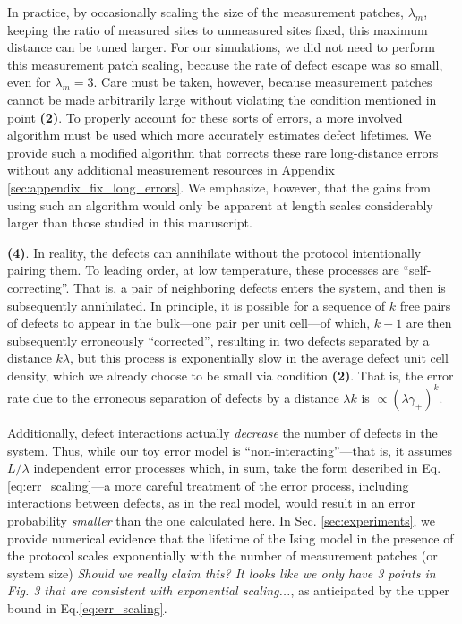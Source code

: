\documentclass[twocolumn,superscriptaddress,aps,prb,floatfix]{revtex4-1}
\newcommand{\CMH}[1]{{\color{green} { #1}}}
\begin{document}
 In practice, by occasionally scaling the size of the measurement patches, $\lambda_m$, keeping the ratio of measured sites to unmeasured sites fixed, this maximum distance can be tuned larger.  For our simulations, we did not need to perform this measurement patch scaling, because the rate of defect escape was so small, even for $\lambda_m=3$.  Care must be taken, however, because measurement patches cannot be made arbitrarily large without violating the condition mentioned in point \textbf{(2)}.  To properly account for these sorts of errors, a more involved algorithm must be used which more accurately estimates defect lifetimes.  We provide such a modified algorithm that corrects these rare long-distance errors without any additional measurement resources in Appendix \ref{sec:appendix_fix_long_errors}.  We emphasize, however, that the gains from using such an algorithm would only be apparent at length scales considerably larger than those studied in this manuscript.

 \textbf{(4)}. In reality, the defects can annihilate without the protocol intentionally pairing them.  To leading order, at low temperature, these processes are ``self-correcting''.  That is, a pair of neighboring defects enters the system, and then is subsequently annihilated.  In principle, it is possible for a sequence of $k$ free pairs of defects to appear in the bulk---one pair per unit cell---of which, $k-1$ are then subsequently erroneously ``corrected'', resulting in two defects separated by a distance $k \lambda$, but this process is exponentially slow in the average defect unit cell density, which we already choose to be small via condition \textbf{(2)}.  That is, the error rate due to the erroneous  separation of defects by a distance $\lambda k$ is $\propto(\lambda \gamma_+)^k$.
 
 Additionally, defect interactions actually \emph{decrease} the number of defects in the system.  Thus, while our toy error model is ``non-interacting''---that is, it assumes $L/\lambda$ independent error processes which, in sum, take the form described in Eq. \ref{eq:err_scaling}---a more careful treatment of the error process, including interactions between defects, as in the real model, would result in an error probability \emph{smaller} than the one calculated here.  In Sec. \ref{sec:experiments}, we provide numerical evidence that the lifetime of the Ising model in the presence of the protocol scales exponentially with the number of measurement patches \CMH{(or system size)} \CMH{\it{Should we really claim this? It looks like we only have 3 points in Fig. 3 that are consistent with exponential scaling...}}, as anticipated by the upper bound in Eq.\ref{eq:err_scaling}.
 
\end{document}
